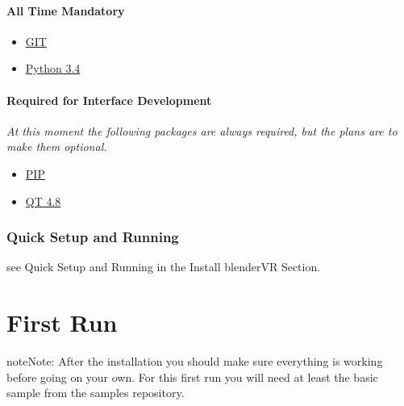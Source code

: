 \documentclass[a4,10pt,openany,oneside]{sphinxmanual}
\begin{document}
\subsubsection{All Time Mandatory}
\label{installation/development:all-time-mandatory}\begin{itemize}
\item {} 
\href{http://git-scm.com/}{GIT}

\item {} 
\href{https://www.python.org/downloads/release/python-343/}{Python 3.4}

\end{itemize}


\subsubsection{Required for Interface Development}
\label{installation/development:required-for-interface-development}
\emph{At this moment the following packages are always required, but the plans are to make them optional.}
\begin{itemize}
\item {} 
\href{https://pip.pypa.io/en/latest/installing.html}{PIP}

\item {} 
\href{http://download.qt.io/archive/qt/4.8/4.8.6/}{QT 4.8}

\end{itemize}


\subsection{Quick Setup and Running}
\label{installation/development:quick-setup-and-running}
see Quick Setup and Running in the Install blenderVR Section.


\chapter{First Run}
\label{first-run:first-run}\label{first-run::doc}
\begin{notice}{note}{Note:}
After the installation you should make sure everything is working before going on your own. For this first run you will need at least the basic sample from the samples repository.
\end{notice}
\end{document}

